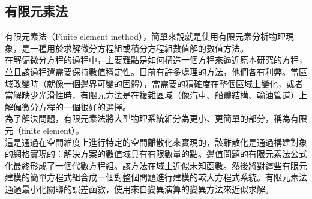 \subsection{有限元素法}

有限元素法（Finite element method），簡單來說就是使用有限元素分析物理現象，是一種用於求解微分方程組或積分方程組數值解的數值方法。\\

在解偏微分方程的過程中，主要難點是如何構造一個方程來逼近原本研究的方程，並且該過程還需要保持數值穩定性。目前有許多處理的方法，他們各有利弊。當區域改變時（就像一個邊界可變的固體），當需要的精確度在整個區域上變化，或者當解缺少光滑性時，有限元方法是在複雜區域（像汽車、船體結構、輸油管道）上解偏微分方程的一個很好的選擇。\\

為了解決問題，有限元素法將大型物理系統細分為更小、更簡單的部分，稱為有限元（finite element）。\\

這是通過在空間維度上進行特定的空間離散化來實現的，該離散化是通過構建對象的網格實現的：解決方案的數值域具有有限數量的點。邊值問題的有限元素法公式化最終形成了一個代數方程組。該方法在域上近似未知函數。然後將對這些有限元建模的簡單方程式組合成一個對整個問題進行建模的較大方程式系統。有限元素法通過最小化關聯的誤差函數，使用來自變異演算的變異方法來近似求解。\\

